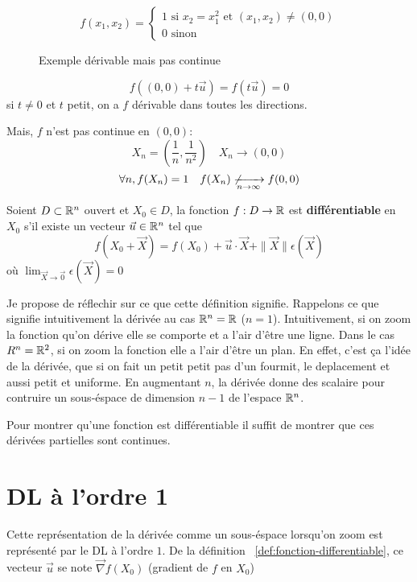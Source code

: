 \begin{eg}
   \[
   f(x_1, x_2) = \begin{cases}
       1  \text{ si } x_2 = x_1^2 \text{ et } (x_1, x_2) \neq (0, 0)\\
       0 \text{ sinon}
   \end{cases}
   \]  
\begin{figure}[H]
    \centering
    \caption{Exemple dérivable mais pas continue}
    \label{fig:exemple-dervie-partielle}
\end{figure}
\[
    f((0, 0) + t \vec{u}) = f(t \vec{u}) = 0
\] 
si $t\neq 0$ et $t$ petit, on a $f$ dérivable dans toutes les directions.
\par
Mais, $f$ n'est pas continue en  $(0, 0)$:
 \[
X_n = (\frac{1}{n}, \frac{1}{n^2}) \quad X_n \to (0, 0)
\] 
\[
\forall n, f(X_n) = 1 \quad f(X_n) \not\xrightarrow[n \to \infty]{} f(0, 0)
\] 
\end{eg}

\begin{definition}\label{def:fonction-differentiable}
    Soient $D \subset \mathbb{R}^n$ ouvert et $X_0 \in D$, la fonction
    $f: D \to \mathbb{R}$
    est \textbf{différentiable} en $X_0$ s'il existe un vecteur $\vec{u} \in \mathbb{R}^n$ tel que 
    \[
        f(X_0 + \vec{X}) = f(X_0) + \vec{u} \cdot \vec{X} + \|\vec{X}\|\epsilon(\vec{X})
    \] 
    où $\lim_{\vec{X} \to \vec{0}} \epsilon(\vec{X}) = 0$
\end{definition}
\begin{intuition}
   Je propose de réflechir sur ce que cette définition signifie. 
   Rappelons ce que signifie intuitivement la dérivée au cas $\mathbb{R}^n = \mathbb{R}$ ($n = 1$). 
   Intuitivement, si on zoom la fonction qu'on dérive elle se comporte et a l'air d'être une ligne. 
   Dans le cas $R^n = \mathbb{R}^2$, si on zoom la fonction elle a l'air d'être un plan. 
   En effet, c'est ça l'idée de la dérivée, que si on fait un petit petit pas d'un fourmit, le deplacement et aussi petit et uniforme. 
   En augmentant $n$, la dérivée donne des scalaire pour contruire un sous-éspace de dimension $n-1$ de l'espace $\mathbb{R}^n$. 
\end{intuition}
\begin{note}
   Pour montrer qu'une fonction est différentiable il suffit de montrer que ces dérivées partielles sont continues. 
\end{note}

\section{DL à l'ordre 1}
Cette représentation de la dérivée comme un sous-éspace lorsqu'on zoom est représenté par le DL à l'ordre $1$.
De la définition ~\ref{def:fonction-differentiable}, ce vecteur $\vec{u}$ se note $\vec{\nabla}f(X_0)$ (gradient de $f$ en  $X_0$)

